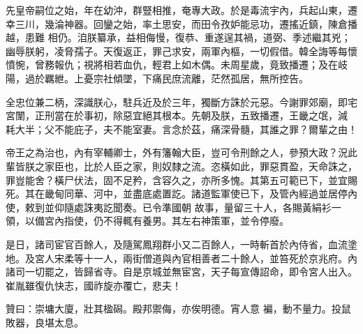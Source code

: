 \begin{pinyinscope}
 先皇帝嗣位之始，年在幼沖，群豎相推，奄專大政。於是毒流宇內，兵起山東，遷幸三川，幾淪神器。回鑾之始，率土思安，而田令孜妒能忌功，遷搖近鎮，陳倉播越，患難
 相仍。洎朕纂承，益相侮慢，復恭、重遂逞其禍，道弼、季述繼其兇；幽辱朕躬，凌脅孺子。天復返正，罪己求安，兩軍內樞，一切假借。韓全誨等每懷憤惋，曾務報仇；視將相若血仇，輕君上如木偶。未周星歲，竟致播遷；及在岐陽，過於羈紲。上憂宗社傾墜，下痛民庶流離，茫然孤居，無所控告。



 全忠位兼二柄，深識朕心，駐兵近及於三年，獨斷方誅於元惡。今謝罪郊廟，即宅宮闈，正刑當在於事初，除惡宜絕其根本。先朝及朕，五致播遷，王畿之氓，減
 耗大半；父不能庇子，夫不能室妻。言念於茲，痛深骨髓，其誰之罪？爾輩之由！



 帝王之為治也，內有宰輔卿士，外有籓翰大臣，豈可令刑餘之人，參預大政？況此輩皆朕之家臣也，比於人臣之家，則奴隸之流。恣橫如此，罪惡貫盈，天命誅之，罪豈能舍？橫尸伏法，固不足矜，含容久之，亦所多愧。其第五可範已下，並宜賜死。其在畿甸同華、河中，並盡底處置訖。諸道監軍使已下，及管內經過並居停內使，敕到並仰隨處誅夷訖聞奏。已令準國朝
 故事，量留三十人，各賜黃絹衫一領，以備宮內指使，仍不得輒有養男。其左右神策軍，並令停廢。



 是日，諸司宦官百餘人，及隨駕鳳翔群小又二百餘人，一時斬首於內侍省，血流塗地。及宮人宋柔等十一人，兩街僧道與內官相善者二十餘人，並笞死於京兆府。內諸司一切罷之，皆歸省寺。自是京城並無宦宮，天子每宣傳詔命，即令宮人出入。崔胤雖復仇快志，國祚旋亦覆亡，悲夫！



 贊曰：崇墉大廈，壯其楹磶。殿邦禦侮，亦俟明德。宵人意
 褊，動不量力。投鼠敗器，良堪太息。



\end{pinyinscope}